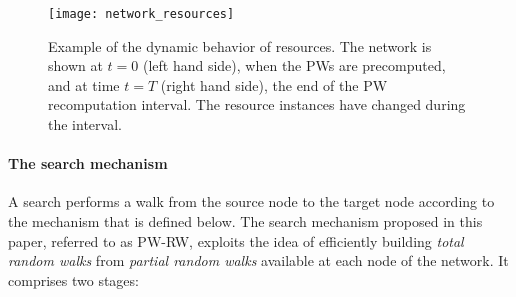 \documentclass[]{elsarticle}
\begin{document}
\begin{figure}
 \centering
 \texttt{[image: network\_resources]}
 \caption{Example of the dynamic behavior of resources. The network is shown at $t\!=\!0$ (left hand side), when the PWs are precomputed, and at time $t=T$ (right hand side), the end of the PW recomputation interval. The resource instances have changed during the interval.} 
 \label{fig:resources}
\end{figure}

\paragraph{The search mechanism}
A search performs a walk from the source node to the target node according to the mechanism that is defined below. The search mechanism proposed in this paper, referred to as PW-RW, exploits the idea of efficiently building \emph{total random walks} from \emph{partial random walks} available at each node of the network. It comprises two stages:
\end{document}
